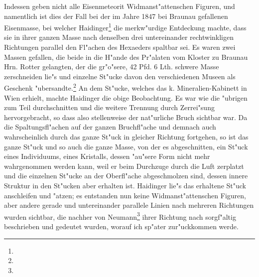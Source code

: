 \documentclass[a4paper, 11pt, oneside]{article}
\begin{document}
Indessen geben nicht alle Eisenmeteorit Widmanst"attenschen Figuren, und namentlich ist dies der Fall bei der im Jahre 1847 bei Braunau gefallenen Eisenmasse, bei welcher Haidinger\footnote{} die merkw"urdige Entdeckung machte, dass sie in ihrer ganzen Masse nach denselben drei untereinander rechtwinkligen Richtungen parallel den Fl"achen des Hexaeders spaltbar sei. Es waren zwei Massen gefallen, die beide in die H"ande des Pr"alaten vom Kloster zu Braunau Hrn. Rotter gelangten, der die gr"o"sere, 42 Pfd. 6 Lth. schwere Masse zerschneiden lie"s und einzelne St"ucke davon den verschiedenen Museen als Geschenk "ubersandte.\footnote{} An dem St"ucke, welches das k. Mineralien-Kabinett in Wien erhielt, machte Haidinger die obige Beobachtung. Es war wie die "ubrigen zum Teil durchschnitten und die weitere Trennung durch Zerrei"sung hervorgebracht, so dass also stellenweise der nat"urliche Bruch sichtbar war. Da die Spaltungsfl"achen auf der ganzen Bruchfl"ache und demnach auch wahrscheinlich durch das ganze St"uck in gleicher Richtung fortgehen, so ist das ganze St"uck und so auch die ganze Masse, von der es abgeschnitten, ein St"uck eines Individuums, eines Kristalls, dessen "au"sere Form nicht mehr wahrgenommen werden kann, weil er beim Durchzuge durch die Luft zerplatzt und die einzelnen St"ucke an der Oberfl"ache abgeschmolzen sind, dessen innere Struktur in den St"ucken aber erhalten ist. Haidinger lie"s das erhaltene St"uck anschleifen und "atzen; es entstanden nun keine Widmanst"attenschen Figuren, aber andere gerade und untereinander parallele Linien nach mehreren Richtungen wurden sichtbar, die nachher von Neumann\footnote{} ihrer Richtung nach sorgf"altig beschrieben und gedeutet wurden, worauf ich sp"ater zur"uckkommen werde.
\end{document}
